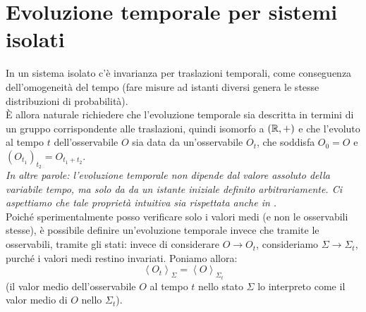 \documentclass[FisicaTeorica.tex]{subfiles}
\begin{document}

\section{Evoluzione temporale per sistemi isolati}
In un sistema isolato c'è invarianza per traslazioni temporali, come conseguenza dell'omogeneità del tempo (fare misure ad istanti diversi genera le stesse distribuzioni di probabilità).\\
È allora naturale richiedere che l'evoluzione temporale sia descritta in termini di un gruppo corrispondente alle traslazioni, quindi isomorfo a $(\mathbb{R},+)$ e che l'evoluto al tempo $t$ dell'osservabile $O$ sia data da un'osservabile $O_t$, che soddisfa $O_0=O$ e $\left(O_{t_1}\right)_{t_2}=O_{t_1+t_2}$.\\
\textit{In altre parole: l'evoluzione temporale non dipende dal valore assoluto della variabile tempo, ma solo da  da un istante iniziale definito arbitrariamente. Ci aspettiamo che tale proprietà intuitiva sia rispettata anche in \MQ.}\\
Poiché sperimentalmente posso verificare solo i valori medi (e non le osservabili stesse), è possibile definire un'evoluzione temporale invece che tramite le osservabili, tramite gli stati: invece di considerare $O\rightarrow O_t$, consideriamo $\Sigma\rightarrow\Sigma_t$, purché i valori medi restino invariati. Poniamo allora:
\[ \left\langle O_t\right\rangle_\Sigma=\left\langle O\right\rangle_{\Sigma_t}
\]
(il valor medio dell'osservabile $O$ al tempo $t$ nello stato $\Sigma$ lo interpreto come il valor medio di $O$ nello  $\Sigma_t$).\\
\end{document}

